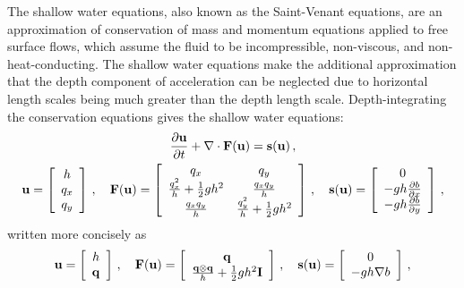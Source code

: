 The shallow water equations, also known as the Saint-Venant equations, are an
approximation of conservation of mass and momentum equations applied to free
surface flows, which assume the fluid to be incompressible, non-viscous, and
non-heat-conducting. The shallow water equations make the additional
approximation that the depth component of acceleration can be neglected due to
horizontal length scales being much greater than the depth length
scale. Depth-integrating the conservation equations gives the shallow
water equations\cite{toro2009}\cite{leveque2002}:
\begin{equation}
\begin{gathered}
  \ppt{\vectorsolution} + \nabla\cdot\consfluxvector(\vectorsolution)
  = \conssource \eqc
\\
  \vectorsolution
    = \left[\begin{array}{c}
        \height\\
        \heightmomentumx\\
        \heightmomentumy
      \end{array}\right]
  \eqc\quad
  \consfluxvector(\vectorsolution)
  = \left[\begin{array}{c c}
      \heightmomentumx & \heightmomentumy\\
      \frac{\heightmomentumx^2}{\height} + \half\gravity\height^2
        & \frac{\heightmomentumx\heightmomentumy}{\height}\\
      \frac{\heightmomentumx\heightmomentumy}{\height}
        & \frac{\heightmomentumy^2}{\height} + \half\gravity\height^2\\
    \end{array}\right]
  \eqc\quad
  \conssource
  = \left[\begin{array}{c}
      0\\
     -\gravity\height\pd{\bathymetry}{x}\\
     -\gravity\height\pd{\bathymetry}{y}\\
    \end{array}\right]
  \eqc
\end{gathered}
\end{equation}
written more concisely as
\[
  \vectorsolution
    = \left[\begin{array}{c}\height\\\heightmomentum\end{array}\right]
  \eqc\quad
  \consfluxvector(\vectorsolution)
  = \left[\begin{array}{c}\heightmomentum\\
      \frac{\heightmomentum\otimes\heightmomentum}{\height}
      + \half\gravity\height^2\identity
    \end{array}\right]
  \eqc\quad
  \conssource
  = \left[\begin{array}{c}0\\-\gravity\height\nabla\bathymetry\end{array}
    \right] \eqc
\]

